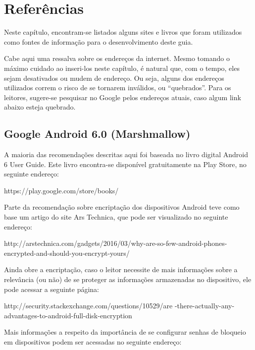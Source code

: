 \chapter{Refer\^encias}

Neste cap\'itulo, encontram-se listados alguns sites e livros que foram utilizados como fontes de informa\c c\~ao para o desenvolvimento deste guia. 

Cabe aqui uma ressalva sobre os endere\c cos da internet. Mesmo tomando o m\'aximo cuidado ao inseri-los neste cap\'itulo, \'e natural que, com o tempo, eles sejam desativados ou mudem de endere\c co. Ou seja, alguns dos endere\c cos utilizados correm o risco de se tornarem inv\'alidos, ou ``quebrados''. Para os leitores, sugere-se pesquisar no Google pelos endere\c cos atuais, caso algum link abaixo esteja quebrado.

\section{Google Android 6.0 (Marshmallow)}

A maioria das recomenda\c c\~oes descritas aqui foi baseada no livro digital Android 6 User Guide. Este livro encontra-se dispon\'ivel gratuitamente na Play Store, no seguinte endere\c co:

\vspace{5mm}
https://play.google.com/store/books/
\vspace{5mm}

Parte da recomenda\c c\~ao sobre encripta\c c\~ao dos dispositivos Android teve como base um artigo do site Ars Technica, que pode ser visualizado no seguinte endere\c co:

\vspace{5mm}
http://arstechnica.com/gadgets/2016/03/why-are-so-few-android-phones-encrypted-and-should-you-encrypt-yours/
\vspace{5mm}

Ainda obre a encripta\c c\~ao, caso o leitor necessite de mais informa\c c\~oes sobre a relev\^ancia (ou n\~ao) de se proteger as informa\c c\~oes armazenadas no dispositivo, ele pode acessar a seguinte p\'agina:

\vspace{5mm}
http://security.stackexchange.com/questions/10529/are -there-actually-any-advantages-to-android-full-disk-encryption
\vspace{5mm}

Mais informa\c c\~oes a respeito da import\^ancia de se configurar senhas de bloqueio em dispositivos podem ser acessadas no seguinte endere\c co:


